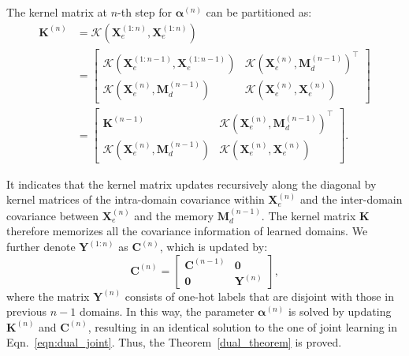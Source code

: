 The kernel matrix at $n$-th step for $\boldsymbol{\alpha}^{\left(n\right)}$ can be partitioned as:
\begin{equation}
\begin{aligned}
    \mathbf{K}^{\left(n\right)} 
        &= \mathcal{K}\left(\mathbf{X}_e^{\left(1:n\right)}, \mathbf{X}_e^{\left(1:n\right)}\right) \\
        &= \begin{bmatrix}
            \mathcal{K}\left(\mathbf{X}_e^{\left(1:n-1\right)}, \mathbf{X}_e^{\left(1:n-1\right)}\right) & \mathcal{K}\left(\mathbf{X}_e^{\left(n\right)}, \mathbf{M}_d^{\left(n-1\right)}\right)^\top  \\
             \mathcal{K}\left(\mathbf{X}_e^{\left(n\right)}, \mathbf{M}_d^{\left(n-1\right)}\right) & \mathcal{K}\left(\mathbf{X}_e^{\left(n\right)}, \mathbf{X}_e^{\left(n\right)}\right)
            \end{bmatrix} \\
        &= \begin{bmatrix}
            \mathbf{K}^{\left(n-1\right)} & \mathcal{K}\left(\mathbf{X}_e^{\left(n\right)}, \mathbf{M}_d^{\left(n-1\right)}\right)^\top  \\
             \mathcal{K}\left(\mathbf{X}_e^{\left(n\right)}, \mathbf{M}_d^{\left(n-1\right)}\right) & \mathcal{K}\left(\mathbf{X}_e^{\left(n\right)}, \mathbf{X}_e^{\left(n\right)}\right)
            \end{bmatrix}.
\end{aligned}
\end{equation}

It indicates that the kernel matrix updates recursively along the diagonal by kernel matrices of the intra-domain covariance within $\mathbf{X}_e^{\left(n\right)}$ and the inter-domain covariance between $\mathbf{X}_e^{\left(n\right)}$ and the memory $\mathbf{M}_d^{\left(n-1\right)}$. The kernel matrix $\mathbf{K}$ therefore memorizes all the covariance information of learned domains. We further denote $\mathbf{Y}^{\left(1:n\right)}$ as $\mathbf{C}^{\left(n\right)}$, which is updated by:
\begin{equation}
    \mathbf{C}^{\left(n\right)} = 
    \begin{bmatrix} 
    \mathbf{C}^{\left(n-1\right)} & \mathbf{0} \\
    \mathbf{0} & \mathbf{Y}^{\left(n\right)}
    \end{bmatrix},
\end{equation}
where the matrix $\mathbf{Y}^{\left(n\right)}$ consists of one-hot labels that are disjoint with those in previous $n-1$ domains. In this way, the parameter $\boldsymbol{\alpha}^{\left(n\right)}$ is solved by updating $\mathbf{K}^{\left(n\right)}$ and $\mathbf{C}^{\left(n\right)}$, resulting in an identical solution to the one of joint learning in Eqn.~\ref{eqn:dual_joint}. Thus, the Theorem~\ref{dual_theorem} is proved.

